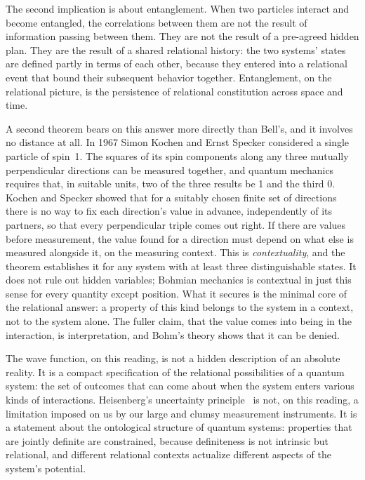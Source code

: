 The second implication is about entanglement.
When two particles interact and become entangled, the correlations between them
are not the result of information passing between them.
They are not the result of a pre-agreed hidden plan.
They are the result of a shared relational history: the two systems' states are
defined partly in terms of each other, because they entered into a relational event
that bound their subsequent behavior together.
Entanglement, on the relational picture, is the persistence of relational
constitution across space and time.

A second theorem bears on this answer more directly than Bell's, and it involves
no distance at all.
In 1967 Simon Kochen and Ernst Specker considered a single particle of spin~1.
The squares of its spin components along any three mutually perpendicular
directions can be measured together, and quantum mechanics requires that, in
suitable units, two of the three results be 1 and the third 0.
Kochen and Specker showed that for a suitably chosen finite set of directions
there is no way to fix each direction's value in advance, independently of its
partners, so that every perpendicular triple comes out right.
If there are values before measurement, the value found for a direction must
depend on what else is measured alongside it, on the measuring context.
This is \emph{contextuality}, and the theorem establishes it for any system with
at least three distinguishable states.
It does not rule out hidden variables; Bohmian mechanics is contextual in just
this sense for every quantity except position.
What it secures is the minimal core of the relational answer: a property of this
kind belongs to the system in a context, not to the system alone.
The fuller claim, that the value comes into being in the interaction, is
interpretation, and Bohm's theory shows that it can be denied.

The wave function, on this reading, is not a hidden description of an absolute
reality.
It is a compact specification of the relational possibilities of a quantum system:
the set of outcomes that can come about when the system enters various kinds of
interactions.
Heisenberg's uncertainty principle~\citep{Heisenberg1927} is not, on this reading,
a limitation imposed on us by our large and clumsy measurement instruments.
It is a statement about the ontological structure of quantum systems: properties
that are jointly definite are constrained, because definiteness is not intrinsic
but relational, and different relational contexts actualize different aspects of
the system's potential.

